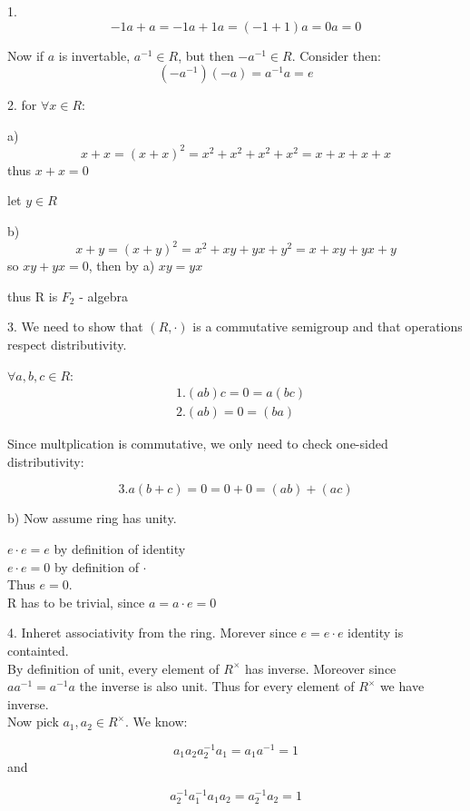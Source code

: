 \documentclass{amsart}
\author{M. Tikhonov}
\begin{document}
1. 
$$ -1a + a = -1a + 1a = (-1 + 1) a = 0a = 0$$

Now if $a$ is invertable, $a^{-1} \in R$, but then $-a^{-1} \in R$. Consider then:
$$(-a ^{-1}) (-a) = a^{-1} a = e$$

2. 
for $\forall x \in R$:

a)$$ x + x = (x+x)^2 = x^2 + x^2 + x^2 + x^2 = x + x + x + x$$
thus $x+x=0$

let $y \in R$


b) $$ x + y = (x+y)^2 = x^2 + xy + yx + y^2 = x + xy + yx + y$$
so 
$xy + yx = 0$, then by a) $xy = yx$

thus R is $F_2$ - algebra 

3. We need to show that $(R, \cdot)$ is a commutative semigroup and that operations respect distributivity.

$\forall a,b,c \in R$:\\

\begin{align*}
    &1. (ab) c = 0 = a (bc)\\
    &2. (ab) = 0 = (ba) 
\end{align*}


Since multplication is commutative, we only need to check one-sided distributivity:

$$3. a (b+c) = 0 = 0 + 0 = (ab) + (ac)$$

b) Now assume ring has unity.

$e \cdot e = e$ by definition of identity \\

$e \cdot e = 0$ by definition of $\cdot$ \\

Thus $e = 0$.\\

R has to be trivial, since $a = a \cdot e = 0$

4. Inheret associativity from the ring. Morever since $e=e \cdot e$ identity is containted.\\

By definition of unit, every element of $R^{\times}$ has inverse. Moreover since $a a^{-1} = a^{-1} a$ the inverse is also unit. Thus for every element of $R^{\times}$ we have inverse.\\

Now pick $a_1, a_2 \in R^{\times}$. We know:

$$a_1 a_2 a_2^{-1} a_1 = a_1 a^{-1} = 1$$
and

$$a_2^{-1} a_1^{-1} a_1 a_2 = a_2^{-1} a_2 = 1$$
\end{document}

